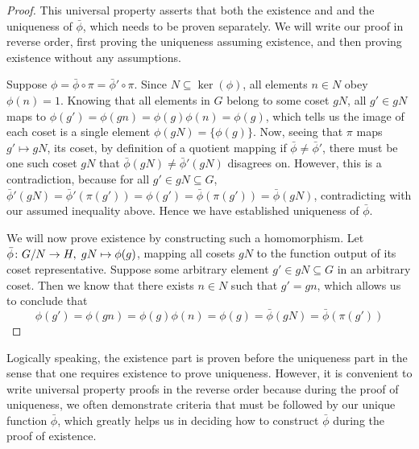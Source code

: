 \begin{proof}
    This universal property asserts that
    both the existence and and the uniqueness of \(\bar{\phi}\),
    which needs to be proven separately.
    We will write our proof in reverse order,
    first proving the uniqueness assuming existence,
    and then proving existence without any assumptions.

    Suppose \(\phi = \bar{\phi}\circ\pi = \bar{\phi}'\circ\pi\).
    Since \(N \subseteq \ker(\phi)\),
    all elements \(n \in N\) obey \(\phi(n) = 1\).
    Knowing that all elements in \(G\) belong to some coset \(gN\),
    all \(g' \in gN\) maps to
    \(\phi(g') = \phi(gn) = \phi(g)\phi(n) = \phi(g)\),
    which tells us the image of each coset
    is a single element \(\phi(gN) = \{\phi(g)\}\).
    Now, seeing that \(\pi\) maps \(g' \mapsto gN\),
    its coset, by definition of a quotient mapping
    if \(\bar{\phi} \neq \bar{\phi}'\),
    there must be one such coset \(gN\)
    that \(\bar{\phi}(gN) \neq \bar{\phi}'(gN)\) disagrees on.
    However, this is a contradiction,
    because for all \(g' \in gN \subseteq G\),
    \(\bar{\phi}'(gN) = \bar{\phi}'(\pi(g')) = \phi(g')
    = \bar{\phi}(\pi(g')) = \bar{\phi}(gN)\),
    contradicting with our assumed inequality above.
    Hence we have established uniqueness of \(\bar{\phi}\).

    We will now prove existence by constructing such a homomorphism.
    Let \(\bar{\phi}\colon G/N\to H,\;gN\mapsto\phi(g)\),
    mapping all cosets \(gN\) to the function output
    of its coset representative.
    Suppose some arbitrary element \(g' \in gN \subseteq G\)
    in an arbitrary coset.
    Then we know that there exists \(n \in N\) such that \(g' = gn\),
    which allows us to conclude that
    \begin{equation*}
        \phi(g') = \phi(gn) = \phi(g)\phi(n) = \phi(g)
        = \bar{\phi}(gN) = \bar{\phi}(\pi(g'))
    \end{equation*}
\end{proof}
\begin{remark}
    Logically speaking,
    the existence part is proven before the uniqueness part
    in the sense that one requires existence to prove uniqueness.
    However, it is convenient to write universal property proofs
    in the reverse order
    because during the proof of uniqueness,
    we often demonstrate criteria that must be followed
    by our unique function \(\bar{\phi}\),
    which greatly helps us in deciding how to construct \(\bar{\phi}\)
    during the proof of existence.
\end{remark}

